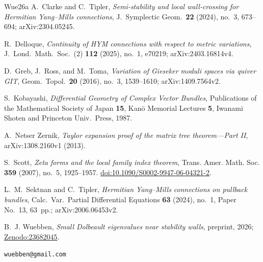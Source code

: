 \documentclass[11pt]{amsart}
\theoremstyle{definition}
\theoremstyle{remark}
\begin{document}
\begin{thebibliography}{Wue26a}
A.~Clarke and C.~Tipler,
\emph{Semi-stability and local wall-crossing for Hermitian Yang--Mills connections},
J.\ Symplectic Geom.\ \textbf{22} (2024), no.~3, 673--694; arXiv:2304.05245.

R.~Delloque,
\emph{Continuity of HYM connections with respect to metric variations},
J.\ Lond.\ Math.\ Soc.\ (2) \textbf{112} (2025), no.~1, e70219;
arXiv:2403.16814v4.

D.~Greb, J.~Ross, and M.~Toma,
\emph{Variation of Gieseker moduli spaces via quiver GIT},
Geom.\ Topol.\ \textbf{20} (2016), no.~3, 1539--1610;
arXiv:1409.7564v2.

S.~Kobayashi,
\emph{Differential Geometry of Complex Vector Bundles},
Publications of the Mathematical Society of Japan \textbf{15},
Kan\=o Memorial Lectures \textbf{5},
Iwanami Shoten and Princeton Univ.\ Press, 1987.

A.~Netser Zernik,
\emph{Taylor expansion proof of the matrix tree theorem---Part II},
arXiv:1308.2160v1 (2013).

S.~Scott,
\emph{Zeta forms and the local family index theorem},
Trans. Amer. Math. Soc. \textbf{359} (2007), no.~5, 1925--1957.
\href{https://doi.org/10.1090/S0002-9947-06-04321-2}{doi:10.1090/S0002-9947-06-04321-2}.

L.~M.~Sektnan and C.~Tipler,
\emph{Hermitian Yang--Mills connections on pullback bundles},
Calc.\ Var.\ Partial Differential Equations \textbf{63} (2024), no.~1,
Paper No.~13, 63~pp.; arXiv:2006.06453v2.

B.~J. Wuebben,
\emph{Small Dolbeault eigenvalues near stability walls},
preprint, 2026; \href{https://doi.org/10.5281/zenodo.23682045}{Zenodo:23682045}.
\end{thebibliography}

\bigskip
{} \texttt{wuebben@gmail.com}
\end{document}
